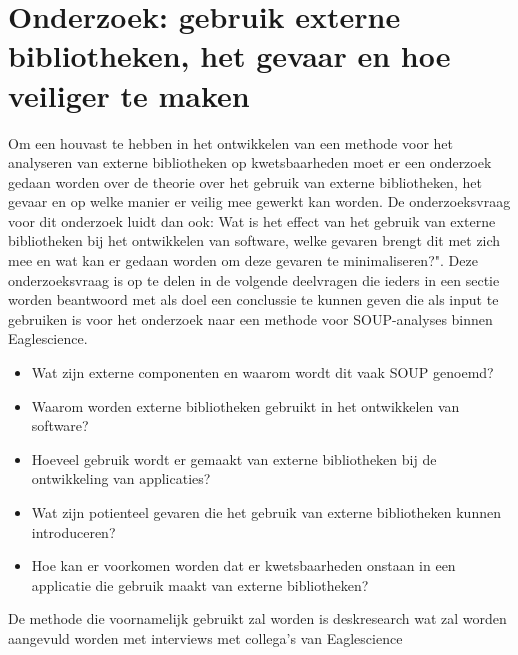 \chapter{Onderzoek: gebruik externe bibliotheken, het gevaar en hoe veiliger te maken}\label{ch:externeBibliothekengebruikGevaren}
Om een houvast te hebben in het ontwikkelen van een methode voor het analyseren van externe bibliotheken op kwetsbaarheden moet er een onderzoek gedaan worden over de theorie over het gebruik van externe bibliotheken, het gevaar en op welke manier er veilig mee gewerkt kan worden. De onderzoeksvraag voor dit onderzoek luidt dan ook: Wat is het effect van het gebruik van externe bibliotheken bij het ontwikkelen van software, welke gevaren brengt dit met zich mee en wat kan er gedaan worden om deze gevaren te minimaliseren?". Deze onderzoeksvraag is op te delen in de volgende deelvragen die ieders in een sectie worden beantwoord met als doel een conclussie te kunnen geven die als input te gebruiken is voor het onderzoek naar een methode voor SOUP-analyses binnen Eaglescience.

\begin{itemize}
    \item Wat zijn externe componenten en waarom wordt dit vaak SOUP genoemd?
    \item Waarom worden externe bibliotheken gebruikt in het ontwikkelen van software?
    \item Hoeveel gebruik wordt er gemaakt van externe bibliotheken bij de ontwikkeling van applicaties?
    \item Wat zijn potienteel gevaren die het gebruik van externe bibliotheken kunnen introduceren?
    \item Hoe kan er voorkomen worden dat er kwetsbaarheden onstaan in een applicatie die gebruik maakt van externe bibliotheken?
\end{itemize}
De methode die voornamelijk gebruikt zal worden is deskresearch wat zal worden aangevuld worden met interviews met collega's van Eaglescience

